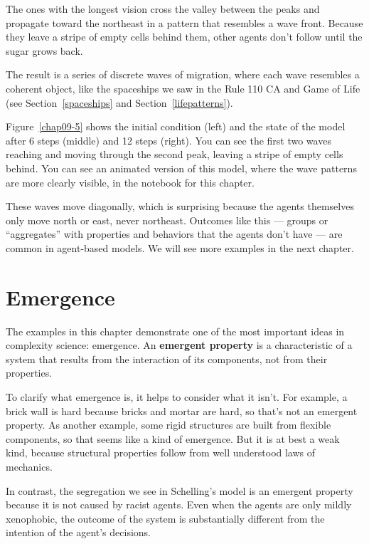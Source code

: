\documentclass[12pt]{book}
\theoremstyle{exercise}
\begin{document}
The ones with the longest vision cross the valley between the
peaks and propagate toward the northeast in a pattern that
resembles a wave front.  Because they leave a stripe of empty cells
behind them, other agents don't follow until the sugar grows back.


The result is a series of discrete waves of migration, where each wave
resembles a coherent object, like the spaceships we saw in the Rule
110 CA and Game of Life (see Section~\ref{spaceships} and
Section~\ref{lifepatterns}).

Figure~\ref{chap09-5} shows the initial condition (left) and the
state of the model after 6 steps (middle) and 12 steps (right).
You can see the first two waves reaching and moving through the
second peak, leaving a stripe of empty cells behind.  You can
see an animated version of this model, where the wave patterns are
more clearly visible, in the notebook for this chapter.

These waves
move diagonally, which is surprising because the agents
themselves only move north or east, never northeast.  Outcomes
like this --- groups or ``aggregates'' with properties and behaviors
that the agents don't have --- are common in agent-based models.
We will see more examples in the next chapter.


\section{Emergence}

The examples in this chapter demonstrate one of the most important
ideas in complexity science: emergence.  An {\bf emergent property} is
a characteristic of a system that results from the interaction of its
components, not from their properties.


To clarify what emergence is, it helps to consider what it isn't.  For
example, a brick wall is hard because bricks and mortar are hard, so
that's not an emergent property.  As another example, some rigid
structures are built from flexible components, so that seems like a
kind of emergence.  But it is at best a weak kind, because structural
properties follow from well understood laws of mechanics.


In contrast, the segregation we see in Schelling's model is an emergent
property because it is not caused by racist agents.  Even when the
agents are only mildly xenophobic, the outcome of the system is
substantially different from the intention of the agent's decisions.
\end{document}
